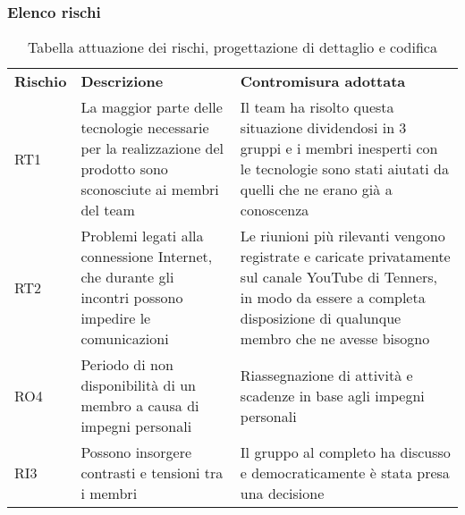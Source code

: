 \subsubsection{Elenco rischi}
\begin{longtable}{|p{2cm}|p{6cm}|p{6cm}|}
	\arrayrulecolor{white}
	\caption{Tabella attuazione dei rischi, progettazione di dettaglio e codifica} \\
	\hline
	\rowcolor{header}
	\textbf{Rischio} & \textbf{Descrizione} & \textbf{Contromisura adottata} \\
	\hline
	RT1 & La maggior parte delle tecnologie necessarie per la realizzazione del prodotto sono sconosciute ai membri del team & Il team ha risolto questa situazione dividendosi in 3 gruppi e i membri inesperti con le tecnologie sono stati aiutati da quelli che ne erano già a conoscenza\\
	RT2 & Problemi legati alla connessione Internet, che durante gli incontri possono impedire le comunicazioni & Le riunioni più rilevanti vengono registrate e caricate privatamente sul canale YouTube di Tenners, in modo da essere a completa disposizione di qualunque membro che ne avesse bisogno
	\\
	RO4 & Periodo di non disponibilità di un membro a causa di impegni personali & Riassegnazione di attività e scadenze in base agli impegni personali
	\\
	RI3 & Possono insorgere contrasti e tensioni tra i membri & Il gruppo al completo ha discusso e democraticamente è stata presa una decisione\\
	\hline
\end{longtable}
